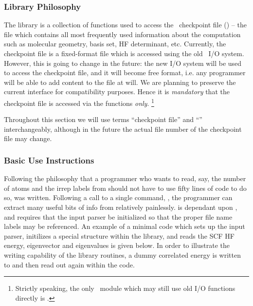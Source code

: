 \subsubsection{Library Philosophy}
The  library is a collection of functions used to
access the \PSIthree\ checkpoint file () -- the file which contains all
most frequently used information about the computation such as
molecular geometry, basis set, HF determinant, etc. Currently, the checkpoint file
is a fixed-format file which is accessed using the old \PSIthree\ I/O system.
However, this is going to change in the future: the new I/O system
will be used to access the checkpoint file, and it will become free format, i.e.
any programmer will be able to add content to the file at will.
We are planning to preserve the current interface for compatibility purposes.
Hence it is {\em mandatory} that the checkpoint file is accessed via the
 functions {\em only}.
\footnote{Strictly speaking, the only \PSIthree\ module which may still use old I/O
functions directly is \PSIinput .}

Throughout this section we will use terms ``checkpoint file'' and ``''
interchangeably, although in the future the actual file number of the checkpoint file
may change.

\subsubsection{Basic Use Instructions}
Following the philosophy that a programmer who wants to read, say,
the number of atoms and the irrep labels from  should not have to use
fifty lines of code to do so,  was written.
Following a call to a
single command, , the programmer can extract many useful bits
of info from  relatively painlessly.  is dependant upon
, and requires that the input parser be initialized so that the
proper file name labels may be referenced.  An example of a minimal code
which sets up the input parser, initilizes a special structure within the
 library, and reads the SCF HF energy, eigenvector and eigenvalues is
given below.  In order to illustrate the writing capability of the library
routines, a dummy correlated energy is written to  and then read out
again within the code.


